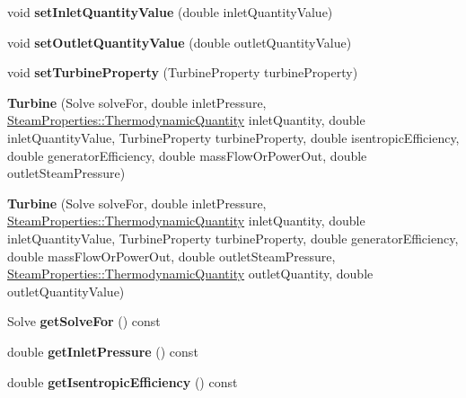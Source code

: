 \begin{DoxyCompactItemize}
\mbox{\label{class_turbine_ac01a053462c83e21ecc2158e75477542}} 
void {\bfseries set\+Inlet\+Quantity\+Value} (double inlet\+Quantity\+Value)
\item 
\mbox{\label{class_turbine_ab37326068f633280de8f8144b9c8eb89}} 
void {\bfseries set\+Outlet\+Quantity\+Value} (double outlet\+Quantity\+Value)
\item 
\mbox{\label{class_turbine_abb3f16cefe52f4e9c7b32b2bb17a68ee}} 
void {\bfseries set\+Turbine\+Property} (Turbine\+Property turbine\+Property)
\item 
\mbox{\label{class_turbine_a3c3c871b9fe57d48dd06b109794381dc}} 
{\bfseries Turbine} (Solve solve\+For, double inlet\+Pressure, \hyperlink{class_steam_properties_ae0294bedf7d178c2d8fb6aed0f62fbff}{Steam\+Properties\+::\+Thermodynamic\+Quantity} inlet\+Quantity, double inlet\+Quantity\+Value, Turbine\+Property turbine\+Property, double isentropic\+Efficiency, double generator\+Efficiency, double mass\+Flow\+Or\+Power\+Out, double outlet\+Steam\+Pressure)
\item 
\mbox{\label{class_turbine_a1ec182906c075407882de542954d9030}} 
{\bfseries Turbine} (Solve solve\+For, double inlet\+Pressure, \hyperlink{class_steam_properties_ae0294bedf7d178c2d8fb6aed0f62fbff}{Steam\+Properties\+::\+Thermodynamic\+Quantity} inlet\+Quantity, double inlet\+Quantity\+Value, Turbine\+Property turbine\+Property, double generator\+Efficiency, double mass\+Flow\+Or\+Power\+Out, double outlet\+Steam\+Pressure, \hyperlink{class_steam_properties_ae0294bedf7d178c2d8fb6aed0f62fbff}{Steam\+Properties\+::\+Thermodynamic\+Quantity} outlet\+Quantity, double outlet\+Quantity\+Value)
\item 
\mbox{\label{class_turbine_a58c73057a4b890eab2af2b42c82484e6}} 
Solve {\bfseries get\+Solve\+For} () const
\item 
\mbox{\label{class_turbine_a148ad3877851f1c3931d8a6771d750c5}} 
double {\bfseries get\+Inlet\+Pressure} () const
\item 
\mbox{\label{class_turbine_a5d907859de4acc153a32bd443238b445}} 
double {\bfseries get\+Isentropic\+Efficiency} () const

\end{DoxyCompactItemize}
